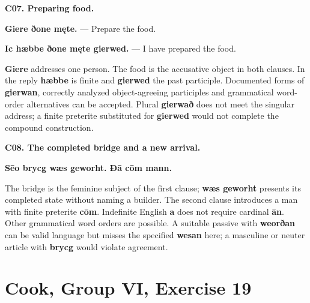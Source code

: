 \par\begin{minipage}{\linewidth}\raggedright
\textbf{C07. Preparing food.}

\textbf{Giere ðone męte.} — Prepare the food.

\textbf{Ic hæbbe ðone męte gierwed.} — I have prepared the food.

\textbf{Giere} addresses one person. The food is the accusative object in both clauses. In the reply \textbf{hæbbe} is finite and \textbf{gierwed} the past participle. Documented forms of \textbf{gierwan}, correctly analyzed object-agreeing participles and grammatical word-order alternatives can be accepted. Plural \textbf{gierwað} does not meet the singular address; a finite preterite substituted for \textbf{gierwed} would not complete the compound construction.

\end{minipage}\par\addvspace{4pt}

\par\begin{minipage}{\linewidth}\raggedright
\textbf{C08. The completed bridge and a new arrival.}

\textbf{Sēo brycg wæs geworht. Ðā cōm mann.}

The bridge is the feminine subject of the first clause; \textbf{wæs geworht} presents its completed state without naming a builder. The second clause introduces a man with finite preterite \textbf{cōm}. Indefinite English \textbf{a} does not require cardinal \textbf{ān}. Other grammatical word orders are possible. A suitable passive with \textbf{weorðan} can be valid language but misses the specified \textbf{wesan} here; a masculine or neuter article with \textbf{brycg} would violate agreement.

\end{minipage}\par\addvspace{4pt}

\section*{Cook, Group VI, Exercise 19}

